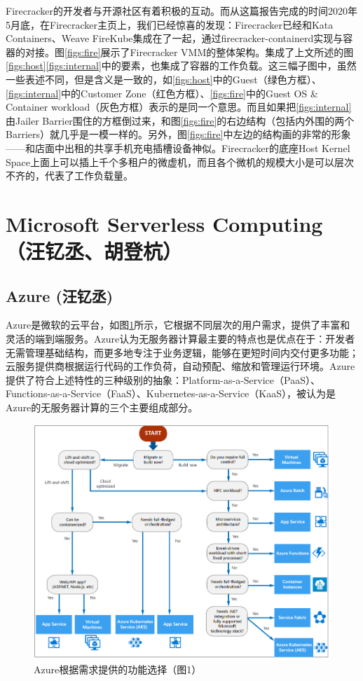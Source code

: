 \documentclass[11pt]{article}
\begin{document}
Firecracker的开发者与开源社区有着积极的互动。而从这篇报告完成的时间2020年5月底，在Firecracker主页上，我们已经惊喜的发现：Firecracker已经和Kata Containers、Weave FireKube集成在了一起，通过firecracker-containerd实现与容器的对接。图\ref{figs:fire}展示了Firecracker VMM的整体架构。集成了上文所述的图\ref{figs:host}\ref{figs:internal}中的要素，也集成了容器的工作负载。这三幅子图中，虽然一些表述不同，但是含义是一致的，如\ref{figs:host}中的Guest（绿色方框）、\ref{figs:internal}中的Customer Zone（红色方框）、\ref{figs:fire}中的Guest OS \& Container workload（灰色方框）表示的是同一个意思。而且如果把\ref{figs:internal}由Jailer Barrier围住的方框倒过来，和图\ref{figs:fire}的右边结构（包括内外围的两个Barriers）就几乎是一模一样的。另外，图\ref{figs:fire}中左边的结构画的非常的形象——和店面中出租的共享手机充电插槽设备神似。Firecracker的底座Host Kernel Space上面上可以插上千个多租户的微虚机，而且各个微机的规模大小是可以层次不齐的，代表了工作负载量。

\section{Microsoft Serverless Computing（汪钇丞、胡登杭）}
\subsection{Azure (汪钇丞)}
Azure是微软的云平台，如图\ref{figs:Overview}所示，它根据不同层次的用户需求，提供了丰富和灵活的端到端服务\cite{overview}。Azure认为无服务器计算最主要的特点也是优点在于：开发者无需管理基础结构，而更多地专注于业务逻辑，能够在更短时间内交付更多功能；云服务提供商根据运行代码的工作负荷，自动预配、缩放和管理运行环境。Azure提供了符合上述特性的三种级别的抽象：Platform-as-a-Service（PaaS）、Functions-as-a-Service（FaaS）、Kubernetes-as-a-Service（KaaS），被认为是Azure的无服务器计算的三个主要组成部分。
\begin{figure}[!htbp]
	\centering
	\includegraphics[scale=0.5]{figs/AzureChoice.PNG}
	\caption{Azure根据需求提供的功能选择（\cite{overview}图1）}
	\label{figs:Overview}
\end{figure}
\end{document}
